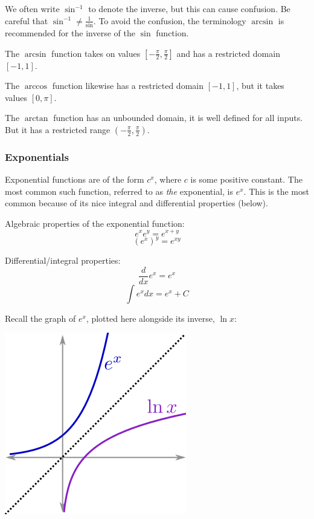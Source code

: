 \documentclass[twoside,openright,titlepage,a4paper]{book}
\begin{document}
\begin{sloppypar}
We often write ${\sin^{-1}}$ to denote the inverse, but this can cause confusion. Be careful that ${\sin^{-1}\neq\displaystyle\frac{1}{\sin}}$. To avoid the confusion, the terminology $\arcsin$ is recommended for the inverse of the $\sin$ function.

The $\arcsin$ function takes on values ${\left[-\displaystyle\frac{\pi}{2},\frac{\pi}{2}\right]}$ and has a restricted domain ${\left[-1,1\right]}$.

The $\arccos$ function likewise has a restricted domain ${\left[-1,1\right]}$, but it takes values ${\left[0,\pi\right]}$.

The $\arctan$ function has an unbounded domain, it is well defined for all inputs. But it has a restricted range ${\displaystyle\left(-\frac{\pi}{2},\frac{\pi}{2}\right)}$.

\subsubsection{Exponentials}

Exponential functions are of the form ${c^x}$, where $c$ is some positive constant. The most common such function, referred to as \textit{the} exponential, is ${e^x}$. This is the most common because of its nice integral and differential properties (below).

Algebraic properties of the exponential function:
\begin{equation*} \displaystyle e^{x}e^{y}=e^{x+y} \end{equation*}
\begin{equation*} \displaystyle (e^{x})^{y}=e^{xy} \end{equation*}

Differential/integral properties:
\begin{equation*} \displaystyle\frac{d}{dx} e^{x}=e^{x} \end{equation*}
\begin{equation*} \displaystyle\int e^{x}dx=e^{x}+C \end{equation*}

Recall the graph of ${e^x}$, plotted here alongside its inverse, ${\ln x}$:
\begin{center}
\includegraphics[scale=0.6]{ExpLn}
\end{center}


\end{sloppypar}
\end{document}
